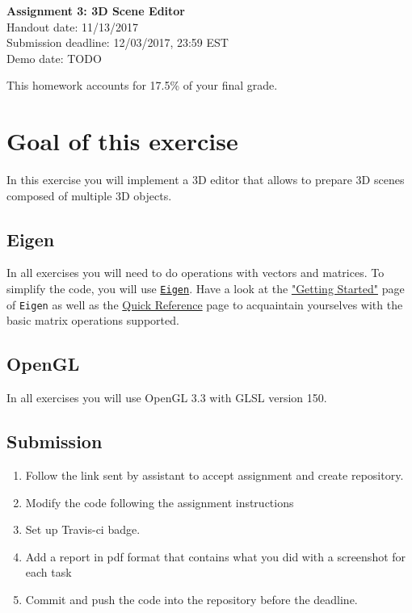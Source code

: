 \documentclass[11pt]{article}
\begin{document}
\hspace{50pt}

\begin{center}

{\Huge \textbf{Assignment 3: 3D Scene Editor}}\\
\vspace{10pt}
Handout date: 11/13/2017\\
Submission deadline: 12/03/2017,  23:59 EST\\
Demo date: TODO
\end{center}

\noindent This homework accounts for 17.5\% of your final grade. 

\section*{Goal of this exercise}
In this exercise you will implement a 3D editor that allows to prepare 3D scenes composed of multiple 3D objects.

\subsection*{Eigen}
In all exercises you will need to do operations with vectors and matrices. To simplify the code, you will use \href{http://eigen.tuxfamily.org/}{\texttt{Eigen}}. 
Have a look at the \href{http://eigen.tuxfamily.org/dox/GettingStarted.html}{"Getting Started"} page of \texttt{Eigen} as well as the \href{http://eigen.tuxfamily.org/dox/group__QuickRefPage.html}{Quick Reference} page to acquaintain yourselves with the basic matrix operations supported. 

\subsection*{OpenGL}
In all exercises you will use OpenGL 3.3 with GLSL version 150.

\subsection*{Submission}

\begin{enumerate}
\item Follow the link sent by assistant to accept assignment and create repository.
\item Modify the code following the assignment instructions
\item Set up Travis-ci badge.
\item Add a report in pdf format that contains what you did with a screenshot for each task
\item Commit and push the code into the repository before the deadline.
\end{enumerate}
\end{document}
